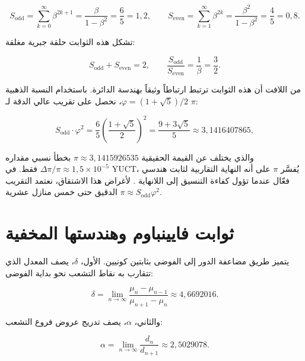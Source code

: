 \documentclass[12pt,a4paper]{article}
\begin{document}
	\begin{equation}
		S_{\mathrm{odd}} = \sum_{k=0}^{\infty} \beta^{2k+1} = \frac{\beta}{1-\beta^2} = \frac{6}{5} = 1{,}2, \qquad
		S_{\mathrm{even}} = \sum_{k=1}^{\infty} \beta^{2k} = \frac{\beta^2}{1-\beta^2} = \frac{4}{5} = 0{,}8.
	\end{equation}
	
	تشكل هذه الثوابت حلقة جبرية مغلقة:
	
	\begin{equation}
		S_{\mathrm{odd}} + S_{\mathrm{even}} = 2, \qquad \frac{S_{\mathrm{odd}}}{S_{\mathrm{even}}} = \frac{1}{\beta} = \frac{3}{2}.
	\end{equation}
	
	من اللافت أن هذه الثوابت ترتبط ارتباطاً وثيقاً بهندسة الدائرة. باستخدام النسبة الذهبية \(\varphi = (1+\sqrt{5})/2\)، نحصل على تقريب عالي الدقة لـ \(\pi\):
	
	\begin{equation}
		S_{\mathrm{odd}} \cdot \varphi^2 = \frac{6}{5} \left( \frac{1+\sqrt{5}}{2} \right)^2 = \frac{9+3\sqrt{5}}{5} \approx 3{,}1416407865,
	\end{equation}
	
	والذي يختلف عن القيمة الحقيقية \(\pi \approx 3{,}1415926535\) بخطأ نسبي مقداره \(\Delta\pi/\pi \approx 1{,}5 \times 10^{-5}\) فقط. في YUCT، يُفسَّر \(\pi\) على أنه النهاية التقاربية لثابت هندسي فعّال عندما تؤول كفاءة التنسيق إلى اللانهاية \cite{AppendixEhrenfest}. لأغراض هذا الاشتقاق، نعتمد التقريب \(\pi \approx S_{\mathrm{odd}}\varphi^2\) الدقيق حتى خمس منازل عشرية.
	
	\section{ثوابت فايينباوم وهندستها المخفية}
	
	يتميز طريق مضاعفة الدور إلى الفوضى بثابتين كونيين. الأول، \(\delta\)، يصف المعدل الذي تتقارب به نقاط التشعب نحو بداية الفوضى:
	
	\begin{equation}
		\delta = \lim_{n\to\infty} \frac{\mu_n - \mu_{n-1}}{\mu_{n+1} - \mu_n} \approx 4{,}6692016.
	\end{equation}
	
	والثاني، \(\alpha\)، يصف تدريج عروض فروع التشعب:
	
	\begin{equation}
		\alpha = \lim_{n\to\infty} \frac{d_n}{d_{n+1}} \approx 2{,}5029078.
	\end{equation}
	
\end{document}
